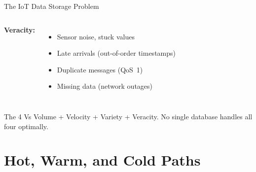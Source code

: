 \documentclass[aspectratio=169,11pt]{beamer}
\begin{document}
\begin{frame}{The IoT Data Storage Problem}
\begin{columns}
        \vspace{0.05cm}
        \textbf{Veracity:}
        \begin{itemize}\setlength{\itemsep}{0pt}
            \item Sensor noise, stuck values
            \item Late arrivals (out-of-order timestamps)
            \item Duplicate messages (QoS~1)
            \item Missing data (network outages)
        \end{itemize}
    \end{columns}

    \begin{alertblock}{The 4 Vs}
        Volume + Velocity + Variety + Veracity. No single database handles all four optimally.
    \end{alertblock}
\end{frame}

\section{Hot, Warm, and Cold Paths}
\end{document}
